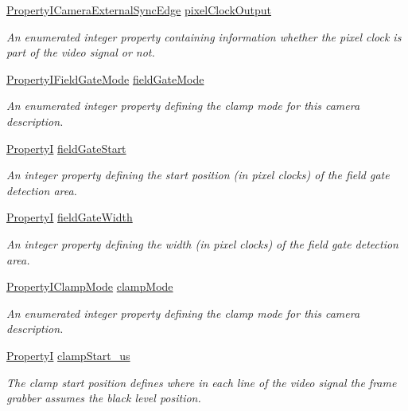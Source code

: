 \begin{DoxyCompactItemize}
\hyperlink{group___device_specific_interface_gaac63793b596b074fc5012dd82aafd035}{Property\+I\+Camera\+External\+Sync\+Edge} \hyperlink{classmv_i_m_p_a_c_t_1_1acquire_1_1_camera_description_non_standard_a06f48f20eb41f74b5c9f0a0f954d0d99}{pixel\+Clock\+Output}
\begin{DoxyCompactList}\small\item\em An enumerated integer property containing information whether the pixel clock is part of the video signal or not. \end{DoxyCompactList}\item 
\hyperlink{group___device_specific_interface_ga625ac6e1557893c15272ebbbeab39958}{Property\+I\+Field\+Gate\+Mode} \hyperlink{classmv_i_m_p_a_c_t_1_1acquire_1_1_camera_description_non_standard_a741b45e81e1aad1caa43cb60068a86c0}{field\+Gate\+Mode}
\begin{DoxyCompactList}\small\item\em An enumerated integer property defining the clamp mode for this camera description. \end{DoxyCompactList}\item 
\hyperlink{group___common_interface_ga12d5e434238ca242a1ba4c6c3ea45780}{Property\+I} \hyperlink{classmv_i_m_p_a_c_t_1_1acquire_1_1_camera_description_non_standard_a1974cb5221b4ace734c8f36502ff95cd}{field\+Gate\+Start}
\begin{DoxyCompactList}\small\item\em An integer property defining the start position (in pixel clocks) of the field gate detection area. \end{DoxyCompactList}\item 
\hyperlink{group___common_interface_ga12d5e434238ca242a1ba4c6c3ea45780}{Property\+I} \hyperlink{classmv_i_m_p_a_c_t_1_1acquire_1_1_camera_description_non_standard_a82b6254a0535520f563521d5826a4921}{field\+Gate\+Width}
\begin{DoxyCompactList}\small\item\em An integer property defining the width (in pixel clocks) of the field gate detection area. \end{DoxyCompactList}\item 
\hyperlink{group___device_specific_interface_ga44f306409b1d737b2eea3f66767e2c23}{Property\+I\+Clamp\+Mode} \hyperlink{classmv_i_m_p_a_c_t_1_1acquire_1_1_camera_description_non_standard_ab91de3b95c85d57f81b5bc7eaae108fa}{clamp\+Mode}
\begin{DoxyCompactList}\small\item\em An enumerated integer property defining the clamp mode for this camera description. \end{DoxyCompactList}\item 
\hyperlink{group___common_interface_ga12d5e434238ca242a1ba4c6c3ea45780}{Property\+I} \hyperlink{classmv_i_m_p_a_c_t_1_1acquire_1_1_camera_description_non_standard_a6135afff218b13b8b1db5eb04729e5b9}{clamp\+Start\+\_\+us}
\begin{DoxyCompactList}\small\item\em The clamp start position defines where in each line of the video signal the frame grabber assumes the black level position. \end{DoxyCompactList}\end{DoxyCompactItemize}
